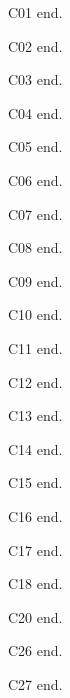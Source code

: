 C01 \Textcite{d1} end.

C02 \Parencite{d1} end.

C03 \Cite{d1} end.

C04 \Autocite{d1} end.

C05 \parencite*{a1} end.

C06 \cites{a1}{b1} end.

C07 \parencites{a1}{b1} end.

C08 \parencites[see][5]{a1}[7]{b1} end.

C09 \textcites{a1}{b1} end.

C10 \Textcites{d1}{a1} end.

C11  end.

C12  end.

C13  end.

C14  end.

C15  end.

C16  end.

C17  end.

C18 \textcite*{a1} end.

C20 \citeyear*{a1} end.

C26 \autocites{a1}{b1} end.

C27 \Parencites{d1}{a1} end.

